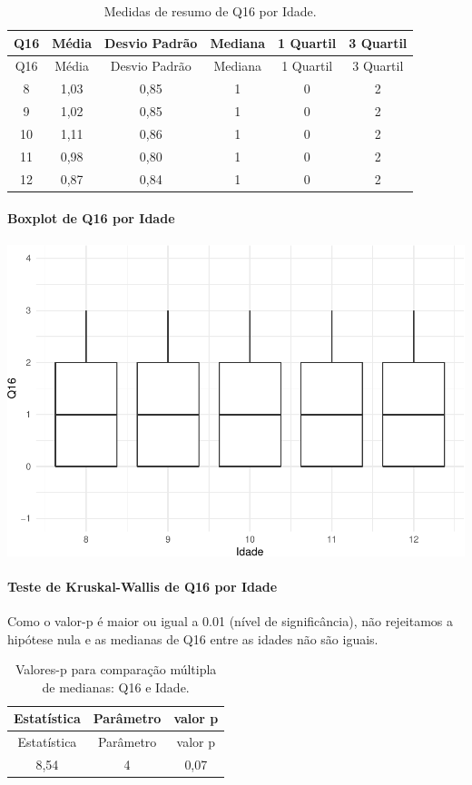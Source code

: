 \documentclass[]{article}
\let\oldparagraph\paragraph
\renewcommand{\paragraph}[1]{\oldparagraph{#1}\mbox{}}
\begin{document}
\begin{longtable}[]{@{}cccccc@{}}
\caption{\label{tab:unnamed-chunk-154}Medidas de resumo de Q16 por Idade.}\tabularnewline
\toprule
Q16 & Média & Desvio Padrão & Mediana & 1 Quartil & 3 Quartil\tabularnewline
\midrule
\endfirsthead
\toprule
Q16 & Média & Desvio Padrão & Mediana & 1 Quartil & 3 Quartil\tabularnewline
\midrule
\endhead
8 & 1,03 & 0,85 & 1 & 0 & 2\tabularnewline
9 & 1,02 & 0,85 & 1 & 0 & 2\tabularnewline
10 & 1,11 & 0,86 & 1 & 0 & 2\tabularnewline
11 & 0,98 & 0,80 & 1 & 0 & 2\tabularnewline
12 & 0,87 & 0,84 & 1 & 0 & 2\tabularnewline
\bottomrule
\end{longtable}

\hypertarget{boxplot-de-q16-por-idade}{%
\paragraph{Boxplot de Q16 por Idade}\label{boxplot-de-q16-por-idade}}

\begin{center}\includegraphics[width=0.75\linewidth]{relatorio_covid19_files/figure-latex/unnamed-chunk-155-1} \end{center}

\hypertarget{teste-de-kruskal-wallis-de-q16-por-idade}{%
\paragraph{Teste de Kruskal-Wallis de Q16 por Idade}\label{teste-de-kruskal-wallis-de-q16-por-idade}}

Como o valor-p é maior ou igual a 0.01 (nível de significância), não rejeitamos a hipótese nula e as medianas de Q16 entre as idades não são iguais.

\begin{longtable}[]{@{}ccc@{}}
\caption{\label{tab:unnamed-chunk-157}Valores-p para comparação múltipla de medianas: Q16 e Idade.}\tabularnewline
\toprule
Estatística & Parâmetro & valor p\tabularnewline
\midrule
\endfirsthead
\toprule
Estatística & Parâmetro & valor p\tabularnewline
\midrule
\endhead
8,54 & 4 & 0,07\tabularnewline
\bottomrule
\end{longtable}
\end{document}
